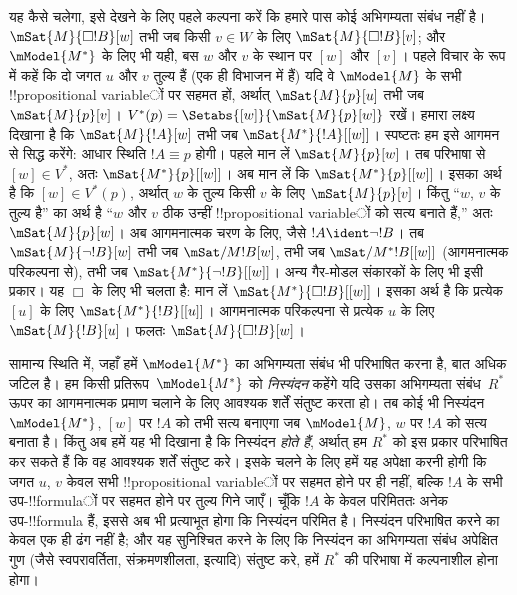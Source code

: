 \documentclass[../../../include/open-logic-section]{subfiles}
\begin{document}
यह कैसे चलेगा, इसे देखने के लिए पहले कल्पना करें कि हमारे पास कोई
अभिगम्यता संबंध नहीं है। $\mSat{M}{\Box !B}[w]$ तभी जब किसी $v \in W$
के लिए $\mSat{M}{\Box !B}[v]$; और $\mModel{M^*}$ के लिए भी यही, बस $w$
और $v$ के स्थान पर $[w]$ और $[v]$। पहले विचार के रूप में कहें कि दो जगत
$u$ और $v$ तुल्य हैं (एक ही विभाजन में हैं) यदि वे $\mModel{M}$ के सभी
!!{propositional variable}ों पर सहमत हों, अर्थात् $\mSat{M}{p}[u]$ तभी जब
$\mSat{M}{p}[v]$। $V^*(p) = \Setabs{[w]}{\mSat{M}{p}[w]}$ रखें। हमारा
लक्ष्य दिखाना है कि $\mSat{M}{!A}[w]$ तभी जब
$\mSat{M^*}{!A}[{[w]}]$। स्पष्टतः हम इसे आगमन से सिद्ध करेंगे: आधार स्थिति
$!A \equiv p$ होगी। पहले मान लें $\mSat{M}{p}[w]$। तब परिभाषा से $[w]
\in V^*$, अतः $\mSat{M^*}{p}[{[w]}]$। अब मान लें कि
$\mSat{M^*}{p}[{[w]}]$। इसका अर्थ है कि $[w] \in V^*(p)$, अर्थात् $w$
के तुल्य किसी $v$ के लिए $\mSat{M}{p}[v]$। किंतु ``$w$, $v$ के तुल्य
है'' का अर्थ है ``$w$ और $v$ ठीक उन्हीं !!{propositional variable}ों को सत्य
बनाते हैं,'' अतः $\mSat{M}{p}[w]$। अब आगमनात्मक चरण के लिए, जैसे $!A
\ident \lnot !B$। तब $\mSat{M}{\lnot !B}[w]$ तभी जब
$\mSat/{M}{!B}[w]$, तभी जब $\mSat/{M^*}{!B}[{[w]}]$ (आगमनात्मक
परिकल्पना से), तभी जब $\mSat{M^*}{\lnot !B}[{[w]}]$। अन्य गैर-मोडल
संकारकों के लिए भी इसी प्रकार। यह $\Box$ के लिए भी चलता है: मान लें
$\mSat{M^*}{\Box !B}[{[w]}]$। इसका अर्थ है कि प्रत्येक $[u]$ के लिए
$\mSat{M^*}{!B}[{[u]}]$। आगमनात्मक परिकल्पना से प्रत्येक $u$ के लिए
$\mSat{M}{!B}[u]$। फलतः $\mSat{M}{\Box !B}[w]$।

सामान्य स्थिति में, जहाँ हमें $\mModel{M^*}$ का अभिगम्यता संबंध भी
परिभाषित करना है, बात अधिक जटिल है। हम किसी प्रतिरूप~$\mModel{M^*}$ को
\emph{निस्यंदन} कहेंगे यदि उसका अभिगम्यता संबंध~$R^*$ ऊपर का आगमनात्मक
प्रमाण चलाने के लिए आवश्यक शर्तें संतुष्ट करता हो। तब कोई भी
निस्यंदन~$\mModel{M^*}$, $[w]$ पर $!A$ को तभी सत्य बनाएगा जब
$\mModel{M}$, $w$ पर $!A$ को सत्य बनाता है। किंतु अब हमें यह भी दिखाना
है कि निस्यंदन \emph{होते हैं}, अर्थात् हम $R^*$ को इस प्रकार परिभाषित
कर सकते हैं कि वह आवश्यक शर्तें संतुष्ट करे। इसके चलने के लिए हमें यह
अपेक्षा करनी होगी कि जगत $u$, $v$ केवल सभी !!{propositional variable}ों पर
सहमत होने पर ही नहीं, बल्कि $!A$ के सभी उप-!!{formula}ों पर सहमत होने पर
तुल्य गिने जाएँ। चूँकि $!A$ के केवल परिमिततः अनेक उप-!!{formula} हैं, इससे
अब भी प्रत्याभूत होगा कि निस्यंदन परिमित है। निस्यंदन परिभाषित करने का
केवल एक ही ढंग नहीं है; और यह सुनिश्चित करने के लिए कि निस्यंदन का
अभिगम्यता संबंध अपेक्षित गुण (जैसे स्वपरावर्तिता, संक्रमणशीलता, इत्यादि)
संतुष्ट करे, हमें $R^*$ की परिभाषा में कल्पनाशील होना होगा।
\end{document}
